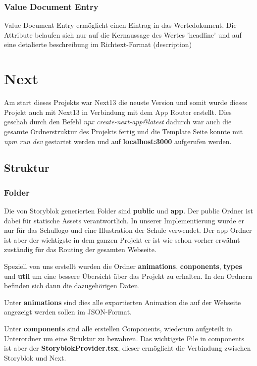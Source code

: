 \subsubsection*{Value Document Entry}
Value Document Entry ermöglicht einen Eintrag in das Wertedokument. Die Attribute belaufen sich nur auf die Kernaussage des Wertes 'headline' und auf eine detalierte beschreibung im Richtext-Format (description) 

\section{Next}

Am start dieses Projekts war Next13 die neuste Version und somit wurde dieses Projekt auch mit Next13 in Verbindung mit dem App Router erstellt.
Dies geschah durch den Befehl \emph{npx create-next-app@latest} dadurch war auch die gesamte Ordnerstruktur des Projekts fertig und die Template Seite konnte mit \emph{npm run dev} gestartet werden und auf \textbf{localhost:3000} aufgerufen werden.

\subsection{Struktur}
\subsubsection*{Folder}
Die von Storyblok generierten Folder sind \textbf{public} und \textbf{app}. 
Der public Ordner ist dabei für statische Assets verantwortlich. In unserer Implementierung wurde er nur für das Schullogo und eine Illustration der Schule verwendet. 
Der app Ordner ist aber der wichtigste in dem ganzen Projekt er ist wie schon vorher erwähnt zuständig für das Routing der gesamten Webseite. 


Speziell von uns erstellt wurden die Ordner \textbf{animations}, \textbf{conponents}, \textbf{types} und \textbf{util} um eine bessere Übersicht über das Projekt zu erhalten. In den Ordnern befinden sich dann die dazugehörigen Daten.

Unter \textbf{animations} sind dies alle exportierten Animation die auf der Webseite angezeigt werden sollen im JSON-Format. 

Unter \textbf{components} sind alle erstellen Components, wiederum aufgeteilt in Unterordner um eine Struktur zu bewahren. Das wichtigste File in components ist aber der \textbf{StoryblokProvider.tsx}, dieser ermöglicht die Verbindung zwischen Storyblok und Next.

